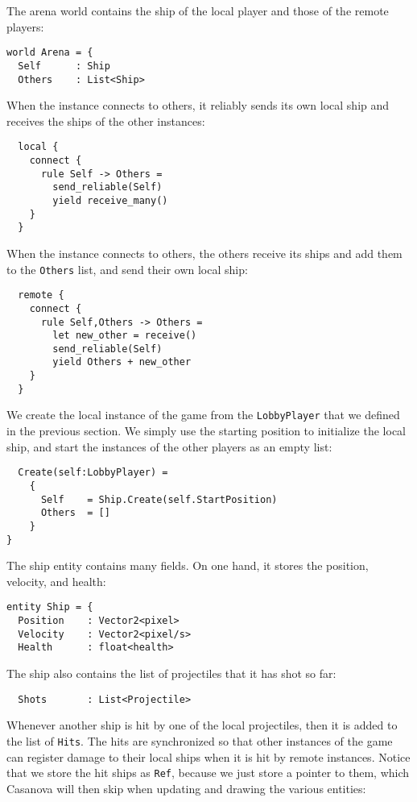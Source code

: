 The arena world contains the ship of the local player and those of the remote players:

\begin{lstlisting}
world Arena = {
  Self		: Ship
  Others	: List<Ship>
\end{lstlisting}

When the instance connects to others, it reliably sends its own local ship and receives the ships of the other instances:

\begin{lstlisting}
  local {
    connect {
      rule Self -> Others = 
      	send_reliable(Self)
      	yield receive_many()
    }
  }
\end{lstlisting}

When the instance connects to others, the others receive its ships and add them to the \texttt{Others} list, and send their own local ship:

\begin{lstlisting}
  remote {
    connect {
      rule Self,Others -> Others = 
      	let new_other = receive()
      	send_reliable(Self)
      	yield Others + new_other
    }
  }
\end{lstlisting}

We create the local instance of the game from the \texttt{LobbyPlayer} that we defined in the previous section. We simply use the starting position to initialize the local ship, and start the instances of the other players as an empty list:

\begin{lstlisting}
  Create(self:LobbyPlayer) =
    {
      Self    = Ship.Create(self.StartPosition)
      Others  = []
    }
}
\end{lstlisting}

The ship entity contains many fields. On one hand, it stores the position, velocity, and health:

\begin{lstlisting}
entity Ship = {
  Position    : Vector2<pixel>
  Velocity    : Vector2<pixel/s>
  Health      : float<health>
\end{lstlisting}

The ship also contains the list of projectiles that it has shot so far:

\begin{lstlisting}
  Shots       : List<Projectile>
\end{lstlisting}

Whenever another ship is hit by one of the local projectiles, then it is added to the list of \texttt{Hits}. The hits are synchronized so that other instances of the game can register damage to their local ships when it is hit by remote instances. Notice that we store the hit ships as \texttt{Ref}, because we just store a pointer to them, which Casanova will then skip when updating and drawing the various entities:

